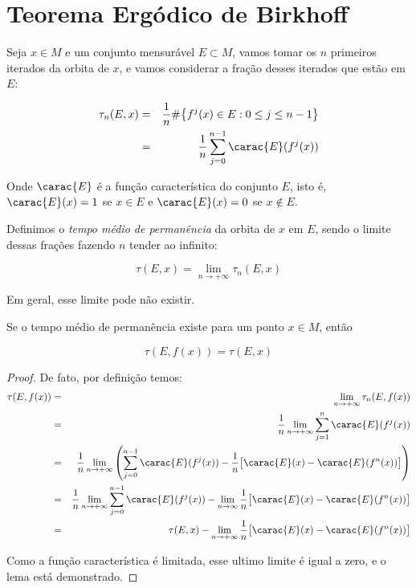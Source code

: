 

\chapter{Teorema Ergódico de Birkhoff}

Seja $x\in M$ e um conjunto mensurável $E\subset M$, vamos tomar os $n$ primeiros iterados da orbita de $x$, e vamos considerar a fração desses iterados que estão em $E$:

\begin{eqnarray}
\tau_n(E,x) & = &\dfrac{1}{n}\#\big\{f^j(x)\in E:0\leq j\leq n-1\big\}\vspace{0.1cm}\nonumber\\
& = & \dfrac{1}{n}\sum_{j=0}^{n-1}\carac{E}(f^j(x))\label{L40}
\end{eqnarray}\vspace{0.1cm}

Onde $\carac{E}$ é a função característica do conjunto $E$, isto é, $\carac{E}(x)=1$ se $x\in E$ e $\carac{E}(x)=0$ se $x\notin E$.

Definimos o \textit{tempo médio de permanência} da orbita de $x$ em $E$, sendo o limite dessas frações fazendo $n$ tender ao infinito:

\begin{equation*}
\tau(E,x)=\lim_{n\to+\infty}\tau_n(E,x)
\end{equation*}\vspace{0.1cm}

Em geral, esse limite pode não existir.

\begin{lema}\label{tmpo}

Se o tempo médio de permanência existe para um ponto $x\in M$, então

\begin{equation*}
\tau(E,f(x))=\tau(E,x)
\end{equation*}\vspace{0.1cm}

\end{lema}

\begin{proof} De fato, por definição temos:
\begin{eqnarray*}
\tau(E,f(x)) & = & \lim_{n\to+\infty}\tau_n(E,f(x))\\
& = & \dfrac{1}{n}\lim_{n\to+\infty}\sum_{j=1}^{n}\carac{E}(f^j(x))\\
& = & \dfrac{1}{n}\lim_{n\to+\infty}\left(\sum_{j=0}^{n-1}\carac{E}(f^j(x))-\dfrac{1}{n}\big[\carac{E}(x)-\carac{E}(f^n(x))\big]\right)\\
& = & \dfrac{1}{n}\lim_{n\to+\infty}\sum_{j=0}^{n-1}\carac{E}(f^j(x))-\lim_{n\to\infty}\dfrac{1}{n}\big[\carac{E}(x)-\carac{E}(f^n(x))\big]\\
& = & \tau(E,x)-\lim_{n\to+\infty}\dfrac{1}{n}\big[\carac{E}(x)-\carac{E}(f^n(x))\big]
\end{eqnarray*}

Como a função característica é limitada, esse ultimo limite é igual a zero, e o lema está demonstrado.
\end{proof}

